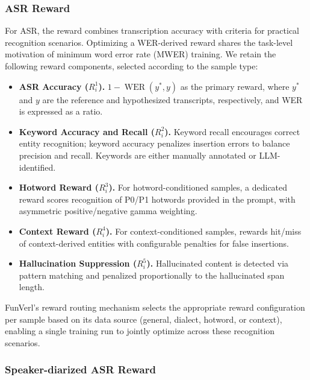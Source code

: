 \documentclass{article}
\begin{document}
\subsubsection{ASR Reward}
\label{subsubsec:asr-reward}

For ASR, the reward combines transcription accuracy with criteria for practical recognition scenarios. Optimizing a WER-derived reward shares the task-level motivation of minimum word error rate (MWER) training. We retain the following reward components, selected according to the sample type:


\begin{itemize}[leftmargin=*,noitemsep]
    \item \textbf{ASR Accuracy ($R_i^1$).} $1 - \operatorname{WER}(y^*, y)$ as the primary reward, where $y^*$ and $y$ are the reference and hypothesized transcripts, respectively, and WER is expressed as a ratio.
    
    \item \textbf{Keyword Accuracy and Recall ($R_i^2$).} Keyword recall encourages correct entity recognition; keyword accuracy penalizes insertion errors to balance precision and recall. Keywords are either manually annotated or LLM-identified.
    
    \item \textbf{Hotword Reward ($R_i^3$).} For hotword-conditioned samples, a dedicated reward scores recognition of P0/P1 hotwords provided in the prompt, with asymmetric positive/negative gamma weighting.
    
    \item \textbf{Context Reward ($R_i^4$).} For context-conditioned samples, rewards hit/miss of context-derived entities with configurable penalties for false insertions.
    
    \item \textbf{Hallucination Suppression ($R_i^5$).} Hallucinated content is detected via pattern matching and penalized proportionally to the hallucinated span length.
    
\end{itemize}

FunVerl's reward routing mechanism selects the appropriate reward configuration per sample based on its data source (general, dialect, hotword, or context), enabling a single training run to jointly optimize across these recognition scenarios.
%
%

\subsubsection{Speaker-diarized ASR Reward}
\label{subsubsec:sd-reward}
\end{document}
